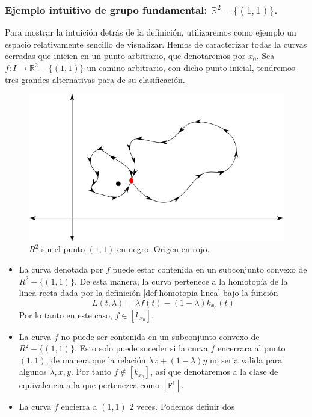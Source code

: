 {\subsubsection{Ejemplo intuitivo de grupo fundamental: \(\mathbb{R}^2 - \{(1,1)\}\).}
Para mostrar la intuición detrás de la definición, utilizaremos como
ejemplo un espacio relativamente sencillo de visualizar. Hemos de
caracterizar todas la curvas cerradas que inicien en un punto
arbitrario, que denotaremos por \(x_0\). Sea \(f : I \to \mathbb{R}^2 -
\{(1,1)\}\) un camino arbitrario, con dicho punto inicial, tendremos
tres grandes alternativas para de su clasificación.
\begin{figure}[h]
  \centering
  \includegraphics[scale=0.5]{./imagenes/R2-punto.png}
  \caption{\(R^2\) sin el punto \((1,1)\) en negro. Origen en rojo. }
  \label{fig:R2-sin-punto}
\end{figure}
\begin{itemize}
\item La curva denotada por \(f\) puede estar contenida en un subconjunto
  convexo de \(R^2 - \{(1,1)\}\). De esta manera, la curva pertenece a la
  homotopía de la linea recta dada por la definición
  \ref{def:homotopia-linea} bajo la función
  \[ L (t,\lambda) = \lambda f (t) - (1 - \lambda) k_{x_0} (t)\]
  Por lo tanto en este caso, \(f \in [k_{x_0}]\).
\item La curva \(f\) no puede ser contenida en un subconjunto convexo de
  \(R^2 - \{ (1,1)\}\). Esto solo puede suceder si la curva \(f\)
  encerrara al punto \((1,1)\), de manera que la relación \(\lambda x +
  (1 - \lambda) y\) no seria valida para algunos \(\lambda, x, y\). Por
  tanto \(f \not \in [k_{x_0}]\), así que denotaremos a la clase de
  equivalencia a la que pertenezca como \([\mathtt{F}^1]\).
\item La curva \(f\) encierra a \((1,1)\) \(2\) veces. Podemos definir dos

\end{itemize}}
